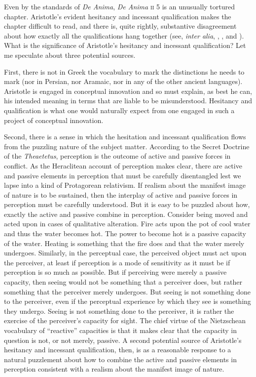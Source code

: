 Even by the standards of \emph{De Anima}, \emph{De Anima} \textsc{ii} 5 is an unusually tortured chapter. Aristotle's evident hesitancy and incessant qualification makes the chapter difficult to read, and there is, quite rightly, substantive disagreement about how exactly all the qualifications hang together (see, \emph{inter alia}, \citealt{Burnyeat:2002an}, \citealt{Heinaman:2007ys}, and \citealt{Bowin:2011uq}). What is the significance of Aristotle's hesitancy and incessant qualification? Let me speculate about three potential sources. 

First, there is not in Greek the vocabulary to mark the distinctions he needs to mark (nor in Persian, nor Aramaic, nor in any of the other ancient languages). Aristotle is engaged in conceptual innovation and so must explain, as best he can, his intended meaning in terms that are liable to be misunderstood. Hesitancy and qualification is what one would naturally expect from one engaged in such a project of conceptual innovation. 

Second, there is a sense in which the hesitation and incessant qualification flows from the puzzling nature of the subject matter. According to the Secret Doctrine of the \emph{Theaetetus}, perception is the outcome of active and passive forces in conflict. As the Heraclitean account of perception makes clear, there are active and passive elements in perception that must be carefully disentangled lest we lapse into a kind of Protagorean relativism. If realism about the manifest image of nature is to be sustained, then the interplay of active and passive forces in perception must be carefully understood. But it is easy to be puzzled about how, exactly the active and passive combine in perception. Consider being moved and acted upon in cases of qualitative alteration. Fire acts upon the pot of cool water and thus the water becomes hot. The power to become hot is a passive capacity of the water. Heating is something that the fire does and that the water merely undergoes. Similarly, in the perceptual case, the perceived object must act upon the perceiver, at least if perception is a mode of sensitivity as it must be if perception is so much as possible. But if perceiving were merely a passive capacity, then seeing would not be something that a perceiver does, but rather something that the perceiver merely undergoes. But seeing is not something done to the perceiver, even if the perceptual experience by which they see is something they undergo. Seeing is not something done to the perceiver, it is rather the exercise of the perceiver's capacity for sight. The chief virtue of the Nietzschean vocabulary of ``reactive'' capacities is that it makes clear that the capacity in question is not, or not merely, passive. A second potential source of Aristotle's hesitancy and incessant qualification, then, is as a reasonable response to a natural puzzlement about how to combine the active and passive elements in perception consistent with a realism about the manifest image of nature.

